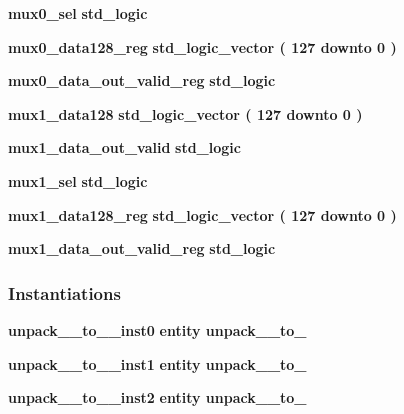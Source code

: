 \begin{DoxyCompactItemize}
\item 
{\bf mux0\+\_\+sel} {\bfseries \textcolor{comment}{std\+\_\+logic}\textcolor{vhdlchar}{ }} 
\item 
{\bf mux0\+\_\+data128\+\_\+reg} {\bfseries \textcolor{comment}{std\+\_\+logic\+\_\+vector}\textcolor{vhdlchar}{ }\textcolor{vhdlchar}{(}\textcolor{vhdlchar}{ }\textcolor{vhdlchar}{ } \textcolor{vhdldigit}{127} \textcolor{vhdlchar}{ }\textcolor{keywordflow}{downto}\textcolor{vhdlchar}{ }\textcolor{vhdlchar}{ } \textcolor{vhdldigit}{0} \textcolor{vhdlchar}{ }\textcolor{vhdlchar}{)}\textcolor{vhdlchar}{ }} 
\item 
{\bf mux0\+\_\+data\+\_\+out\+\_\+valid\+\_\+reg} {\bfseries \textcolor{comment}{std\+\_\+logic}\textcolor{vhdlchar}{ }} 
\item 
{\bf mux1\+\_\+data128} {\bfseries \textcolor{comment}{std\+\_\+logic\+\_\+vector}\textcolor{vhdlchar}{ }\textcolor{vhdlchar}{(}\textcolor{vhdlchar}{ }\textcolor{vhdlchar}{ } \textcolor{vhdldigit}{127} \textcolor{vhdlchar}{ }\textcolor{keywordflow}{downto}\textcolor{vhdlchar}{ }\textcolor{vhdlchar}{ } \textcolor{vhdldigit}{0} \textcolor{vhdlchar}{ }\textcolor{vhdlchar}{)}\textcolor{vhdlchar}{ }} 
\item 
{\bf mux1\+\_\+data\+\_\+out\+\_\+valid} {\bfseries \textcolor{comment}{std\+\_\+logic}\textcolor{vhdlchar}{ }} 
\item 
{\bf mux1\+\_\+sel} {\bfseries \textcolor{comment}{std\+\_\+logic}\textcolor{vhdlchar}{ }} 
\item 
{\bf mux1\+\_\+data128\+\_\+reg} {\bfseries \textcolor{comment}{std\+\_\+logic\+\_\+vector}\textcolor{vhdlchar}{ }\textcolor{vhdlchar}{(}\textcolor{vhdlchar}{ }\textcolor{vhdlchar}{ } \textcolor{vhdldigit}{127} \textcolor{vhdlchar}{ }\textcolor{keywordflow}{downto}\textcolor{vhdlchar}{ }\textcolor{vhdlchar}{ } \textcolor{vhdldigit}{0} \textcolor{vhdlchar}{ }\textcolor{vhdlchar}{)}\textcolor{vhdlchar}{ }} 
\item 
{\bf mux1\+\_\+data\+\_\+out\+\_\+valid\+\_\+reg} {\bfseries \textcolor{comment}{std\+\_\+logic}\textcolor{vhdlchar}{ }} 
\end{DoxyCompactItemize}
\subsubsection*{Instantiations}
 \begin{DoxyCompactItemize}
\item 
{\bf unpack\+\_\+\_\+to\+\_\+\_\+inst0}  {\bfseries entity unpack\+\_\+\_\+to\+\_}   
\item 
{\bf unpack\+\_\+\_\+to\+\_\+\_\+inst1}  {\bfseries entity unpack\+\_\+\_\+to\+\_}   
\item 
{\bf unpack\+\_\+\_\+to\+\_\+\_\+inst2}  {\bfseries entity unpack\+\_\+\_\+to\+\_}   
\end{DoxyCompactItemize}


